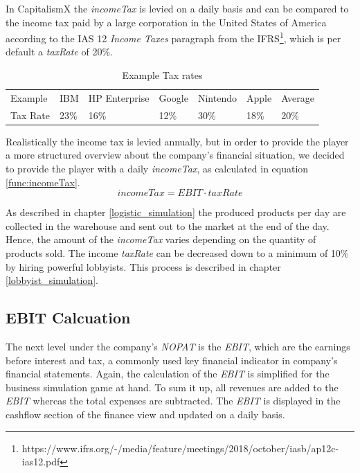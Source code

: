 In CapitalismX the \textit{incomeTax} is levied on a daily basis and can be compared to the income tax paid by a large corporation in the United States of America according to the IAS 12 \textit{Income Taxes} paragraph from the IFRS\footnote{https://www.ifrs.org/-/media/feature/meetings/2018/october/iasb/ap12c-ias12.pdf}, which is per default a \textit{taxRate} of 20\%. 


\begin{table}[]
\centering
\begin{tabular}{|l|l|l|l|l|l|l|}
\hline
Example & IBM & HP Enterprise & Google & Nintendo & Apple & Average \\
Tax Rate & 23\% & 16\% & 12\% & 30\% & 18\% & 20\% \\ \hline
\end{tabular}
\caption{Example Tax rates}
\label{Example_Tax}
\end{table}

Realistically the income tax is levied annually, but in order to provide the player a more structured overview about the company’s financial situation, we decided to provide the player with a daily \textit{incomeTax}, as calculated in equation \ref{func:incomeTax}. 
\begin{equation}
    \label{func:incomeTax}
    incomeTax = EBIT \cdot taxRate
\end{equation}

As described in chapter \ref{logistic_simulation} the produced products per day are collected in the warehouse and sent out to the market at the end of the day. Hence, the amount of the \textit{incomeTax} varies depending on the quantity of products sold. The income \textit{taxRate} can be decreased down to a minimum of 10\% by hiring powerful lobbyists. This process is described in chapter \ref{lobbyist_simulation}.

\subsection{EBIT Calcuation}

The next level under the company's \textit{NOPAT} is the \textit{EBIT}, which are the earnings before interest and tax, a commonly used key financial indicator in company's financial statements. \cite{lee_e_2006} Again, the calculation of the \textit{EBIT} is simplified for the business simulation game at hand. To sum it up, all revenues are added to the \textit{EBIT} whereas the total expenses are subtracted. The \textit{EBIT} is displayed in the cashflow section of the finance view and updated on a daily basis.

